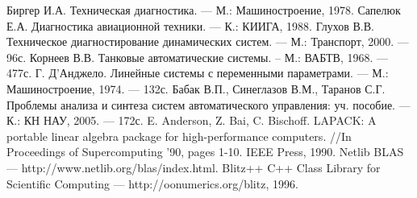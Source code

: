 \begin{thebibliography}{99}
 Биргер И.А. Техническая диагностика. --- М.: Машиностроение, 1978.
 Сапелюк Е.А. Диагностика авиационной техники. --- К.: КИИГА, 1988.
 Глухов В.В. Техническое диагностирование динамических систем. --- М.: Транспорт, 2000. --- 96с.
 Корнеев В.В. Танковые автоматические системы. – М.: ВАБТВ, 1968. --- 477с.
 Г. Д'Анджело. Линейные системы с переменными параметрами. --- М.: Машиностроение, 1974. --- 132с.
 Бабак В.П., Синеглазов В.М., Таранов С.Г. Проблемы анализа и синтеза систем 
автоматического управления: уч. пособие. --- К.: КН НАУ, 2005. --- 172с.
 E. Anderson, Z. Bai, C. Bischoff. LAPACK: A portable linear algebra package for high-performance computers. //In Proceedings of Supercomputing '90, pages 1-10. IEEE Press, 1990. 
 Netlib BLAS --- http://www.netlib.org/blas/index.html.
 Blitz++ C++ Class Library for Scientific Computing --- http://oonumerics.org/blitz, 1996.

\end{thebibliography}